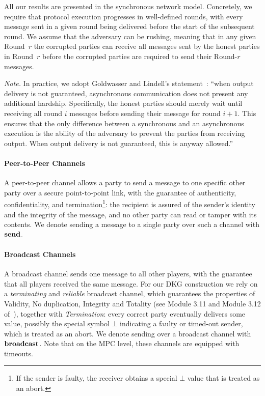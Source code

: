 All our results are presented in the synchronous network model.
Concretely, we require that protocol execution progresses in well-defined rounds, with every message sent in a given round being delivered before the start of the subsequent round.
We assume that the adversary can be rushing, meaning that in any given Round~$r$ the corrupted parties can receive all messages sent by the honest parties in Round~$r$ before the corrupted parties are required to send their Round-$r$ messages.

\medskip
\noindent\emph{Note.} In practice, we adopt Goldwasser and Lindell's statement~\cite{GoldwasserLindell02}: ``when output delivery is not guaranteed, asynchronous communication does not present any additional hardship. Specifically, the honest parties should merely wait until receiving all round $i$ messages before sending their message for round $i+1$. This ensures that the only difference between a synchronous and an asynchronous execution is the ability of the adversary to prevent the parties from receiving output. When output delivery is not guaranteed, this is anyway allowed.''

\paragraph{Peer-to-Peer Channels}
A peer-to-peer channel allows a party to send a message to one specific other party
over a secure point-to-point link, with the guarantee of authenticity, confidentiality,
and termination\footnote{If the sender is faulty, the receiver obtains a special $\bot$ value that is treated as an abort.}:
the recipient is assured of the sender's identity and the integrity of the message,
and no other party can read or tamper with its contents.
We denote sending a message to a single party over such a channel with $\mathbf{send}$.

\paragraph{Broadcast Channels}
A broadcast channel sends one message to all other players,
with the guarantee that all players received the same message.
For our DKG construction we rely on a \emph{terminating} and \emph{reliable} broadcast channel, which
guarantees the properties of Validity, No duplication, Integrity and Totality
(see Module 3.11 and Module 3.12 of~\cite{CGR11}), together with \emph{Termination}: every correct
party eventually delivers some value, possibly the special symbol $\bot$ indicating a faulty or
timed-out sender, which is treated as an abort.
We denote sending over a broadcast channel with $\mathbf{broadcast}$. Note that on the MPC level,
these channels are equipped with timeouts.

